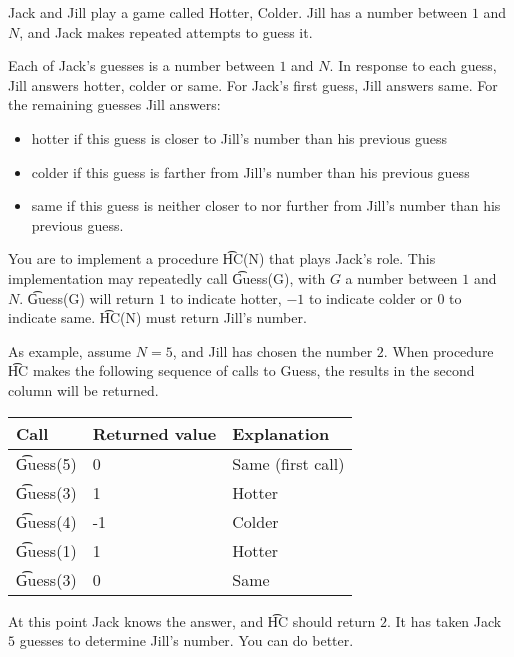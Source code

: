 Jack and Jill play a game called Hotter, Colder. Jill has a number between $1$ and $N$,
and Jack makes repeated attempts to guess it.

Each of Jack's guesses is a number between $1$ and $N$. In response to each guess, Jill
answers hotter, colder or same. For Jack's first guess, Jill answers same. For the
remaining guesses Jill answers:

\begin{itemize}
\item hotter if this guess is closer to Jill's number than his previous guess
\item colder if this guess is farther from Jill's number than his previous guess
\item same if this guess is neither closer to nor further from Jill's number than his
previous guess.
\end{itemize}

You are to implement a procedure \t{HC(N)} that plays Jack's role. This implementation
may repeatedly call \t{Guess(G)}, with $G$ a number between $1$ and $N$. \t{Guess(G)} will return $1$ to indicate hotter, $-1$ to indicate colder or $0$ to indicate same. \t{HC(N)} must return Jill's number.

As example, assume $N=5$, and Jill has chosen the number $2$. When
procedure \t{HC} makes the following sequence of calls to Guess, the results in the
second column will be returned.

\begin{tabular}{|l|l|l|} \hline
Call & Returned value & Explanation \\ \hline
\t{Guess(5)} & 0 & Same (first call) \\ \hline
\t{Guess(3)} & 1 & Hotter \\ \hline
\t{Guess(4)} & -1 & Colder \\ \hline
\t{Guess(1)} & 1 & Hotter \\ \hline
\t{Guess(3)} & 0 & Same \\ \hline
\end{tabular}

At this point Jack knows the answer, and \t{HC} should return $2$. It has taken Jack $5$
guesses to determine Jill's number. You can do better.